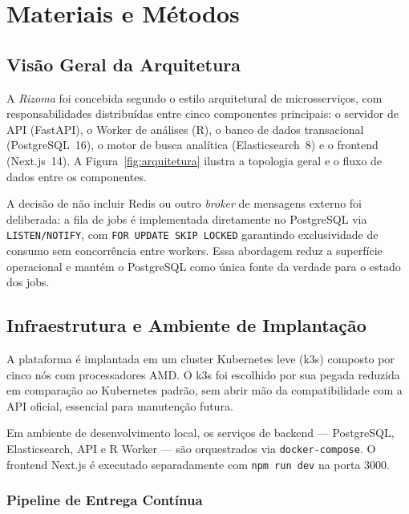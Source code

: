 \chapter{Materiais e Métodos}
\label{cap:metodos}

\section{Visão Geral da Arquitetura}

A \textit{Rizoma} foi concebida segundo o estilo arquitetural de
microsserviços, com responsabilidades distribuídas entre cinco
componentes principais: o servidor de API (FastAPI), o Worker de
análises (R), o banco de dados transacional (PostgreSQL~16), o motor
de busca analítica (Elasticsearch~8) e o frontend (Next.js~14). A
Figura~\ref{fig:arquitetura} ilustra a topologia geral e o fluxo de
dados entre os componentes.


A decisão de não incluir Redis ou outro \textit{broker} de mensagens
externo foi deliberada: a fila de jobs é implementada diretamente no
PostgreSQL via \texttt{LISTEN/NOTIFY}, com \texttt{FOR UPDATE SKIP
LOCKED} garantindo exclusividade de consumo sem concorrência entre
workers. Essa abordagem reduz a superfície operacional e mantém o
PostgreSQL como única fonte da verdade para o estado dos jobs.

\section{Infraestrutura e Ambiente de Implantação}

A plataforma é implantada em um cluster Kubernetes leve (k3s) composto
por cinco nós com processadores AMD. O k3s foi escolhido por sua
pegada reduzida em comparação ao Kubernetes padrão, sem abrir mão da
compatibilidade com a API oficial, essencial para manutenção futura.

Em ambiente de desenvolvimento local, os serviços de backend — PostgreSQL,
Elasticsearch, API e R Worker — são orquestrados via
\texttt{docker-compose}. O frontend Next.js é executado separadamente
com \texttt{npm run dev} na porta 3000.

\subsection{Pipeline de Entrega Contínua}
\label{sec:cicd}


